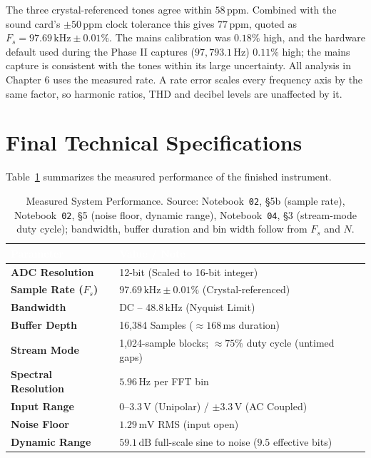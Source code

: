 \documentclass[11pt, a4paper]{report}
\begin{document}
The three crystal-referenced tones agree within $58$\,ppm. Combined with the sound card's $\pm 50$\,ppm clock tolerance this gives $77$\,ppm, quoted as $F_s = 97.69\,\text{kHz} \pm 0.01\%$. The mains calibration was $0.18\%$ high, and the hardware default used during the Phase II captures ($97{,}793.1$\,Hz) $0.11\%$ high; the mains capture is consistent with the tones within its large uncertainty. All analysis in Chapter 6 uses the measured rate. A rate error scales every frequency axis by the same factor, so harmonic ratios, THD and decibel levels are unaffected by it.

\section{Final Technical Specifications}
Table~\ref{tab:specs} summarizes the measured performance of the finished instrument.

\begin{table}[htbp]
  \centering
  \small\sffamily
  \renewcommand{\arraystretch}{1.3}

  \begin{tabular}{@{} l l @{}}
    \toprule
    \rowcolor{TableHeader}
    \textbf{\textcolor{white}{Parameter}} &
    \textbf{\textcolor{white}{Value / Note}} \\
    \midrule

    \textbf{ADC Resolution}       & 12-bit (Scaled to 16-bit integer) \\
    \textbf{Sample Rate ($F_s$)} & $97.69\,\text{kHz} \pm 0.01\%$ (Crystal-referenced) \\
    \textbf{Bandwidth}           & DC -- 48.8\,kHz (Nyquist Limit) \\
    \textbf{Buffer Depth}        & 16,384 Samples ($\approx 168$\,ms duration) \\
    \textbf{Stream Mode}         & 1,024-sample blocks; $\approx 75\%$ duty cycle (untimed gaps) \\
    \textbf{Spectral Resolution} & $5.96\,\text{Hz}$ per FFT bin \\
    \textbf{Input Range}         & 0--3.3\,V (Unipolar) / $\pm 3.3$\,V (AC Coupled) \\
    \textbf{Noise Floor}         & $1.29\,\text{mV}$ RMS (input open) \\
    \textbf{Dynamic Range}       & $59.1\,\text{dB}$ full-scale sine to noise ($9.5$ effective bits) \\
    \bottomrule
  \end{tabular}

  \caption{Measured System Performance. Source: Notebook~\texttt{02}, \S5b (sample rate), Notebook~\texttt{02}, \S5 (noise floor, dynamic range), Notebook~\texttt{04}, \S3 (stream-mode duty cycle); bandwidth, buffer duration and bin width follow from $F_s$ and $N$.}
  \label{tab:specs}
\end{table}
\end{document}
